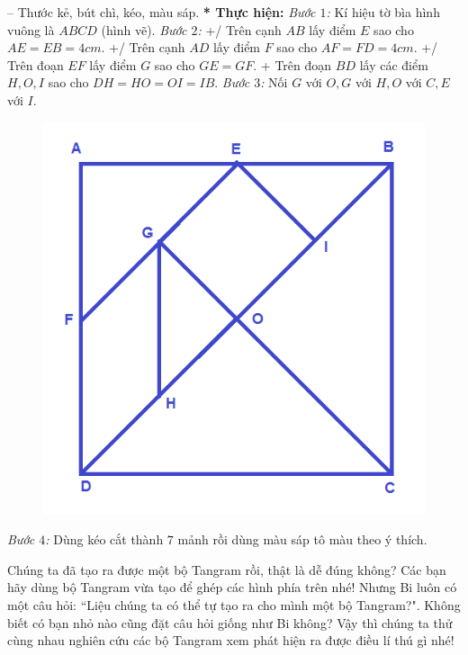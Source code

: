\begin{multicols}{2}
	\vskip 0.1cm
	-- Thước kẻ, bút chì, kéo, màu sáp.
	\vskip 0.1cm
	\textbf{\color{toancuabi}* Thực hiện:}
	\vskip 0.1cm
	\textit{Bước $1$:} Kí hiệu tờ bìa hình vuông là $ABCD$ (hình vẽ).
	\vskip 0.1cm
	\textit{Bước $2$:} 
	\vskip0.05cm
	+/ Trên cạnh $AB$ lấy điểm $E$ sao cho $AE = EB = 4cm$.
	\vskip 0.1cm
	+/ Trên cạnh $AD$ lấy điểm $F$ sao cho $AF = FD = 4cm$.
	\vskip 0.1cm
	+/ Trên đoạn $EF$ lấy điểm $G$ sao cho $GE= GF$.
	\vskip 0.1cm
	+ Trên đoạn $BD$ lấy các điểm $H, O, I$ sao cho $DH = HO = OI = IB$.
	\vskip 0.1cm
	\textit{Bước $3$:} Nối $G$ với $O, G$ với $H, O$ với $C, E$ với $I$.
	\begin{figure}[H]
		\vspace*{-10pt}
		\centering
		\includegraphics[scale=0.2]{image9}
		\vspace*{-10pt}
	\end{figure}
	\textit{Bước $4$:} Dùng kéo cắt thành $7$ mảnh rồi dùng màu sáp tô màu theo ý thích.
	\end{multicols}
	Chúng ta đã tạo ra được một bộ Tangram rồi, thật là dễ đúng không? Các bạn hãy dùng bộ Tangram vừa tạo để ghép các hình phía trên nhé!
	\vskip 0.1cm
	Nhưng Bi luôn có một câu hỏi: ``Liệu chúng ta có thể tự tạo ra cho mình một bộ Tangram?". Không biết có bạn nhỏ nào cũng đặt câu hỏi giống như Bi không?
	\vskip 0.1cm
	Vậy thì chúng ta thử cùng nhau nghiên cứu các bộ Tangram xem phát hiện ra được điều lí thú gì nhé!
